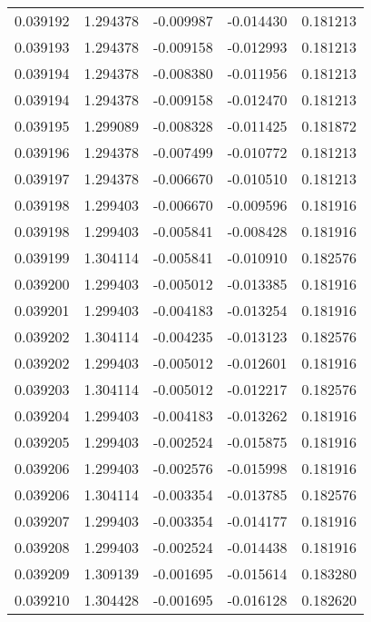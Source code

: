 \begin{tabular}{lrrrr}
0.039192    &  1.294378 & -0.009987 & -0.014430 &             0.181213 \\
0.039193    &  1.294378 & -0.009158 & -0.012993 &             0.181213 \\
0.039194    &  1.294378 & -0.008380 & -0.011956 &             0.181213 \\
0.039194    &  1.294378 & -0.009158 & -0.012470 &             0.181213 \\
0.039195    &  1.299089 & -0.008328 & -0.011425 &             0.181872 \\
0.039196    &  1.294378 & -0.007499 & -0.010772 &             0.181213 \\
0.039197    &  1.294378 & -0.006670 & -0.010510 &             0.181213 \\
0.039198    &  1.299403 & -0.006670 & -0.009596 &             0.181916 \\
0.039198    &  1.299403 & -0.005841 & -0.008428 &             0.181916 \\
0.039199    &  1.304114 & -0.005841 & -0.010910 &             0.182576 \\
0.039200    &  1.299403 & -0.005012 & -0.013385 &             0.181916 \\
0.039201    &  1.299403 & -0.004183 & -0.013254 &             0.181916 \\
0.039202    &  1.304114 & -0.004235 & -0.013123 &             0.182576 \\
0.039202    &  1.299403 & -0.005012 & -0.012601 &             0.181916 \\
0.039203    &  1.304114 & -0.005012 & -0.012217 &             0.182576 \\
0.039204    &  1.299403 & -0.004183 & -0.013262 &             0.181916 \\
0.039205    &  1.299403 & -0.002524 & -0.015875 &             0.181916 \\
0.039206    &  1.299403 & -0.002576 & -0.015998 &             0.181916 \\
0.039206    &  1.304114 & -0.003354 & -0.013785 &             0.182576 \\
0.039207    &  1.299403 & -0.003354 & -0.014177 &             0.181916 \\
0.039208    &  1.299403 & -0.002524 & -0.014438 &             0.181916 \\
0.039209    &  1.309139 & -0.001695 & -0.015614 &             0.183280 \\
0.039210    &  1.304428 & -0.001695 & -0.016128 &             0.182620 \\

\end{tabular}
